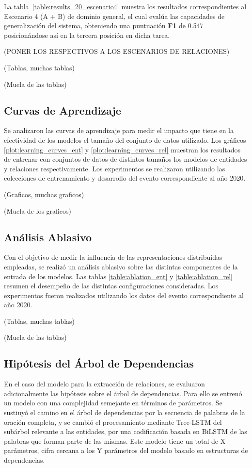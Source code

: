 La tabla~\ref{table:results_20_escenario4} muestra los resultados correspondientes al Escenario 4 (A + B) de dominio general, el cual eval\'ua las capacidades de generalizaci\'on del sistema, obteniendo una puntuaci\'on \textbf{F1} de 0.547 posicion\'andose as\'i en la tercera posici\'on en dicha tarea.

(PONER LOS RESPECTIVOS A LOS ESCENARIOS DE RELACIONES)
 
(Tablas, muchas tablas)

(Muela de las tablas)

\subsection{Curvas de Aprendizaje}

Se analizaron las curvas de aprendizaje para medir el impacto que tiene en la efectividad de los modelos el tamaño del conjunto de datos utilizado.
Los gráficos \ref{plot:learning_curves_ent} y \ref{plot:learning_curves_rel} muestran los resultados de entrenar con conjuntos de datos de distintos tamaños los modelos de entidades y relaciones respectivamente.
Los experimentos se realizaron utilizando las colecciones de entrenamiento y desarrollo del evento correspondiente al año 2020.

(Graficos, muchas graficos)

(Muela de los graficos)

\subsection{Análisis Ablasivo}

Con el objetivo de medir la influencia de las representaciones distribuidas empleadas, se realizó un análisis ablasivo sobre las distintas componentes de la entrada de los modelos.
Las tablas \ref{table:ablation_ent} y \ref{table:ablation_rel} resumen el desempeño de las distintas configuraciones consideradas.
Los experimentos fueron realizados utilizando los datos del evento correspondiente al año 2020.

(Tablas, muchas tablas)

(Muela de las tablas)

\subsection{Hipótesis del Árbol de Dependencias}

En el caso del modelo para la extracción de relaciones, se evaluaron adicionalmente las hipótesis sobre el árbol de dependencias.
Para ello se entrenó un modelo con una complejidad semejante en términos de parámetros.
Se sustiuyó el camino en el árbol de dependencias por la secuencia de palabras de la oración completa, y se cambió el procesamiento mediante Tree-LSTM del subárbol relevante a las entidades, por una codificación basada en BiLSTM de las palabras que forman parte de las mismas.
Este modelo tiene un total de X parámetros, cifra cercana a los Y parámetros del modelo basado en estructuras de dependencias.

